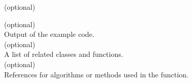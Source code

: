 \noindent
[{\bf Example}] (optional)
{\footnotesize}

\noindent
[{\bf Output}] (optional)\\
Output of the example code.\\

 (optional)\\
A list of related classes and functions.\\

\noindent
[{\bf References}] (optional)\\
References for algorithms or methods used in the function.\\


